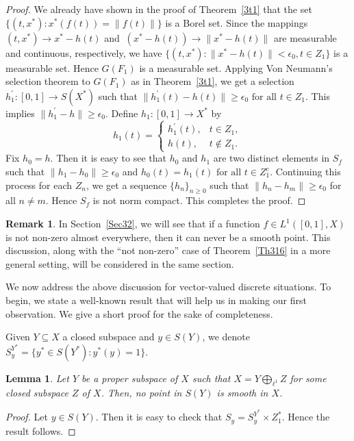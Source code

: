 \documentclass[12pt]{amsart}
\newtheorem{lemma}[theorem]{Lemma}
\theoremstyle{definition}
\newtheorem{remark}[theorem]{Remark}
\numberwithin{equation}{section}
\begin{document}
\begin{proof}
We already have shown in the proof of Theorem~\ref{3t1} that the set $\{(t,x^*):x^*(f(t))=\|f(t)\|\}$ is a Borel set. Since the mappings $(t,x^*)\rightarrow x^*-h(t)$ and $\ (x^*-h(t))\rightarrow\|x^*-h(t)\|$ are measurable and continuous, respectively, we have $\{(t,x^*):\|x^*-h(t)\|<\epsilon_{0}, t \in Z_1\}$ is a measurable set. Hence $ G(F_1) $ is a measurable set. Applying Von Neumann's selection theorem to $G(F_{1})$ as in Theorem~\ref{3t1}, we get a selection $h^{'}_1: [0,1] \to S(X^*)$ such that $\|h^{'}_1(t)- h(t)\|\geq\epsilon_{0}\text{ for all  } t \in Z_1$. This implies $ \|h^{'}_1- h\|\geq \epsilon_{0}$. Define $ h_1: [0,1] \to X^* $ by
\[
h_{1}(t) =
\begin{cases} 
h^{'}_{1}(t), & t \in Z_{1} , \\
h(t), & t \notin Z_{1}.
\end{cases}
\]
Fix $h_{0}=h$. Then it is easy to see that $h_{0}$ and  $h_1$ are two distinct elements in $ S_f $ such that $\|h_1- h_{0}\|\geq\epsilon_{0}$ and $h_{0}(t)=h_{1}(t) \text{ for all } t\in Z_{1}^{c}$.
Continuing this process for each $Z_{n}$, we get a sequence $\{h_n\}_{n\geq0}$ such that $\|h_n-h_m\|\geq\epsilon_{0}$ for all $n\neq m$. Hence $S_{f}$ is not norm compact. This completes the proof.
\end{proof}
\begin{remark}\label{naddr}
In Section~\ref{Sec32}, we will see that if a function $f\in L^1([0,1],X)$ is not non-zero almost everywhere, then it can never be a smooth point. This discussion, along with the “not non-zero” case of Theorem~\ref{Th316} in a more general setting, will be considered in the same section.
\end{remark}

We now address the above discussion for vector-valued discrete situations. To begin, we state a well-known result that will help us in making our first observation. We give a short proof for the sake of completeness.

Given $Y\subseteq X$ a closed subspace and $y\in S(Y)$, we denote $S^{Y^*}_{y}=\{y^*\in S(Y^*):y^*(y)=1\}$.
\begin{lemma}\label{2l1}
    Let $Y$ be a proper subspace of $X$ such that $X=Y\bigoplus_{\ell^1} Z$ for some closed subspace $Z$ of $X$. Then, no point in $S(Y)$ is smooth in $X$.
\end{lemma}
\begin{proof}
Let $y\in S(Y)$. Then it is easy to check that $S_y=S^{Y^*}_y\times Z_1^*$. Hence the result follows.
\end{proof}
\end{document}
